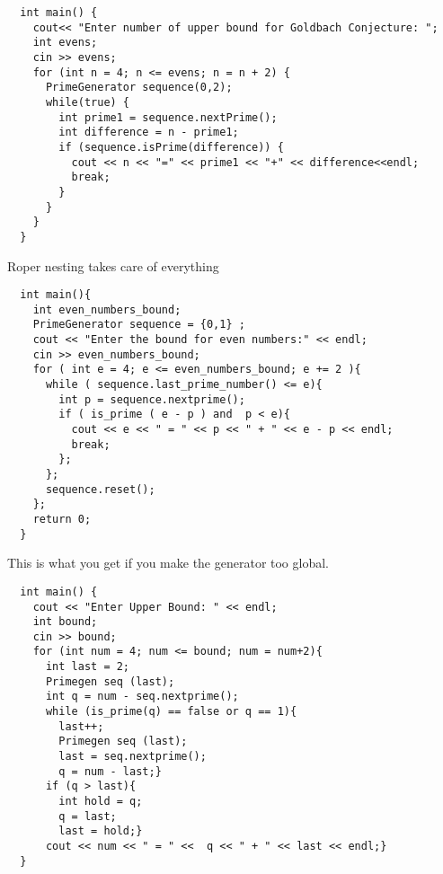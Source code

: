 

\begin{lstlisting}
  int main() {
    cout<< "Enter number of upper bound for Goldbach Conjecture: ";
    int evens;
    cin >> evens;
    for (int n = 4; n <= evens; n = n + 2) {
      PrimeGenerator sequence(0,2);
      while(true) {
        int prime1 = sequence.nextPrime();
        int difference = n - prime1;
        if (sequence.isPrime(difference)) {
          cout << n << "=" << prime1 << "+" << difference<<endl;
          break;
        }
      }
    }
  }
\end{lstlisting}

Roper nesting takes care of everything


\begin{lstlisting}
  int main(){
    int even_numbers_bound;
    PrimeGenerator sequence = {0,1} ;
    cout << "Enter the bound for even numbers:" << endl;
    cin >> even_numbers_bound;
    for ( int e = 4; e <= even_numbers_bound; e += 2 ){
      while ( sequence.last_prime_number() <= e){
        int p = sequence.nextprime();
        if ( is_prime ( e - p ) and  p < e){
          cout << e << " = " << p << " + " << e - p << endl;
          break;
        };
      };
      sequence.reset();
    };
    return 0;
  }
\end{lstlisting}

This is what you get if you make the generator too global.


\begin{lstlisting}
  int main() {
    cout << "Enter Upper Bound: " << endl;
    int bound;
    cin >> bound;
    for (int num = 4; num <= bound; num = num+2){
      int last = 2;
      Primegen seq (last);
      int q = num - seq.nextprime();
      while (is_prime(q) == false or q == 1){
        last++;
        Primegen seq (last);
        last = seq.nextprime();
        q = num - last;}
      if (q > last){
        int hold = q;
        q = last;
        last = hold;}
      cout << num << " = " <<  q << " + " << last << endl;}
  }
\end{lstlisting}

